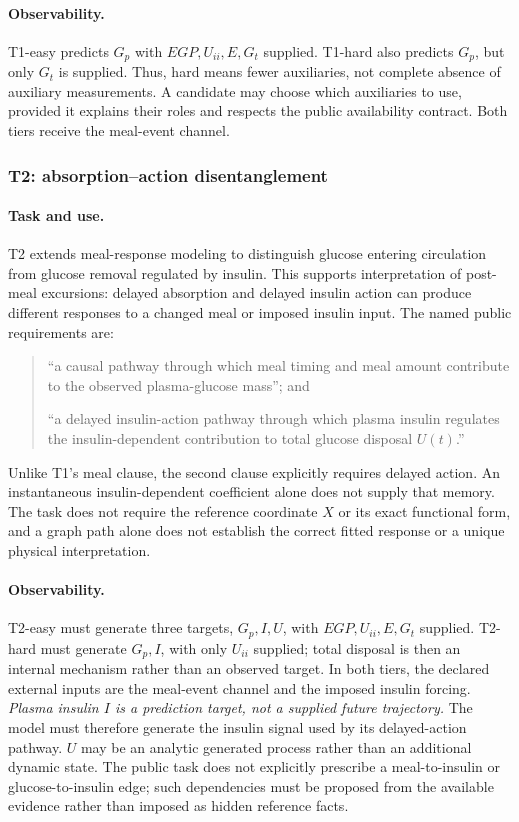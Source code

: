 \paragraph{Observability.}
T1-easy predicts $G_p$ with $EGP,U_{ii},E,G_t$ supplied. T1-hard also predicts
$G_p$, but only $G_t$ is supplied. Thus, hard means fewer auxiliaries, not
complete absence of auxiliary measurements. A candidate may choose which
auxiliaries to use, provided it explains their roles and respects the public
availability contract. Both tiers receive the meal-event channel.

\subsubsection{T2: absorption--action disentanglement}
\label{app:benchmark_t2}

\paragraph{Task and use.}
T2 extends meal-response modeling to distinguish glucose entering circulation
from glucose removal regulated by insulin. This supports interpretation of
post-meal excursions: delayed absorption and delayed insulin action can produce
different responses to a changed meal or imposed insulin input. The named
public requirements are:
\begin{quote}
``a causal pathway through which meal timing and meal amount contribute to the
observed plasma-glucose mass''; and

``a delayed insulin-action pathway through which plasma insulin regulates the
insulin-dependent contribution to total glucose disposal $U(t)$.''
\end{quote}
Unlike T1's meal clause, the second clause explicitly requires delayed action.
An instantaneous insulin-dependent coefficient alone does not supply that
memory. The task does not require the reference coordinate $X$ or its exact
functional form, and a graph path alone does not establish the correct fitted
response or a unique physical interpretation.

\paragraph{Observability.}
T2-easy must generate three targets, $G_p,I,U$, with $EGP,U_{ii},E,G_t$ supplied.
T2-hard must generate $G_p,I$, with only $U_{ii}$ supplied; total disposal is
then an internal mechanism rather than an observed target. In both tiers,
the declared external inputs are the meal-event channel and the imposed
insulin forcing. \emph{Plasma insulin $I$ is a prediction target, not a supplied
future trajectory.} The model must therefore generate the insulin signal used
by its delayed-action pathway. $U$ may be an analytic generated process rather
than an additional dynamic state. The public task does not explicitly prescribe
a meal-to-insulin or glucose-to-insulin edge; such dependencies must be proposed
from the available evidence rather than imposed as hidden reference facts.

